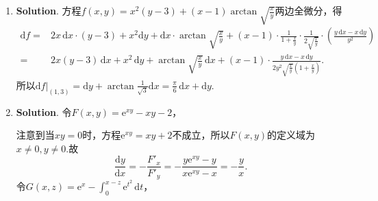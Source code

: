 \documentclass[../main.tex]{subfiles}
\begin{document}
\begin{enumerate}
          消去$z$得$x^{2}+y^{2}+x+y=0$，即$\left(x+\frac{1}{2}\right)^{2}+\left(y+\frac{1}{2}
              \right)^{2}=\frac{1}{2}$.

          令$\begin{cases}
                  x = \frac{\sqrt{2}}{2}\cos \theta-\frac{1}{2}, \\[6pt]
                  y = \frac{\sqrt{2}}{2}\sin \theta-\frac{1}{2}
              \end{cases}(0\leq \theta < 2\pi)$，则$z=1-x-y=2-\frac{\sqrt{2}}{2}(\cos \theta
              +\sin \theta)=2-\sin\left(\theta+\frac{\pi}{4}\right)$.

          因此交线的参数方程为$\begin{cases}
                  x = \frac{\sqrt{2}}{2}\cos \theta-\frac{1}{2}, \\[6pt]
                  y = \frac{\sqrt{2}}{2}\sin \theta-\frac{1}{2}, \\[6pt]
                  z = 2-\sin\left(\theta+\frac{\pi}{4}\right)
              \end{cases}(0\leq \theta < 2\pi)$.

    \item \textbf{Solution}. 方程$f(x,y) = x^{2}(y-3)+(x-1)\arctan\sqrt{\frac{x}{y}}$两边全微分，得
          \[
              \begin{aligned}
                  \mathrm{d}f = {} & 2x\,\mathrm{d}x\cdot (y-3) +x^{2} \mathrm{d}y +\mathrm{d}x\cdot \arctan\sqrt{\frac{x}{y}}+(x-1)\cdot\frac{1}{1+\frac{x}{y}}\cdot \frac{1}{2\sqrt{\frac{x}{y}}}\cdot\left(\frac{y\,\mathrm{d}x-x\,\mathrm{d}y}{y^2}\right) \\
                  = {}             & 2x(y-3)\,\mathrm{d}x +x^{2}\,\mathrm{d}y+\arctan\sqrt{\frac{x}{y}}\,\mathrm{d}x+(x-1)\cdot\frac{y\,\mathrm{d}x-x\,\mathrm{d}y}{2y^2\sqrt{\frac{x}{y}}\left(1+\frac{x}{y}\right)}.
              \end{aligned}
          \]
          所以$\left.\mathrm{d}f\right|_{(1,3)}=\mathrm{d}y + \arctan\frac{1}{\sqrt{3}}
              \mathrm{d}x = \frac{\pi}{6}\,\mathrm{d}x + \mathrm{d}y$.

    \item \textbf{Solution}. 令$F(x,y) = \mathrm{e}^{xy}-xy-2$，

          注意到当$xy = 0$时，方程$\mathrm{e}^{xy}= xy+2$不成立，所以$F(x,y)$的定义域为$x
              \neq0,y\neq0$.故
          \[
              \frac{\mathrm{d}y}{\mathrm{d}x}=-\frac{F'_{x}}{F'_{y}}=-\frac{y\mathrm{e}^{xy}-y}{x\mathrm{e}^{xy}-x}
              =-\frac{y}{x}.
          \]
          令$G(x,z) = \mathrm{e}^{x} - \int_{0}^{x-z}\mathrm{e}^{t^2}\,\mathrm{d}t$，


\end{enumerate}
\end{document}
